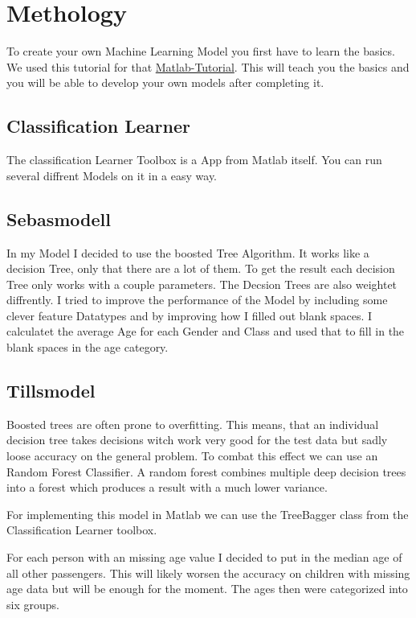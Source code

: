 \documentclass[
   10.5pt,
   invert-title=true,
   titlepage=false,
   titleimage-ratio=13,
   class=article
]{bfhpub}				%
\begin{document}
\section*{Methology}
To create your own Machine Learning Model you first have to learn the basics. We used this tutorial for that \href{https://blogs.mathworks.com/loren/2015/06/18/getting-started-with-kaggle-data-science-competitions/}{Matlab-Tutorial}.
This will teach you the basics and you will be able to develop your own models after completing it.

\subsection*{Classification Learner}
The classification Learner Toolbox is a App from Matlab itself. You can run several diffrent Models on it in a easy way.

\subsection*{Sebasmodell}
In my Model I decided to use the boosted Tree Algorithm. It works like a decision Tree, only that there are a lot of them. To get the result each decision Tree only works with a couple parameters. The Decsion Trees are also weightet diffrently.
I tried to improve the performance of the Model by including some clever feature Datatypes and by improving how I filled out blank spaces. I calculatet the average Age for each Gender and Class and used that to fill in the blank spaces in the age category.

\subsection*{Tillsmodel}
Boosted trees are often prone to overfitting. This means, that an individual decision tree takes decisions witch work very good for the test data but sadly loose accuracy on the general problem.
To combat this effect we can use an Random Forest Classifier. A random forest  combines multiple deep decision trees into a forest which produces a result with a much lower variance.

For implementing this model in Matlab we can use the TreeBagger class from the Classification Learner toolbox.

For each person with an missing age value I decided to put in the median age of all other passengers. This will likely worsen the accuracy on children with missing age data but will be enough for the moment. The ages then were categorized into six groups.
\end{document}

